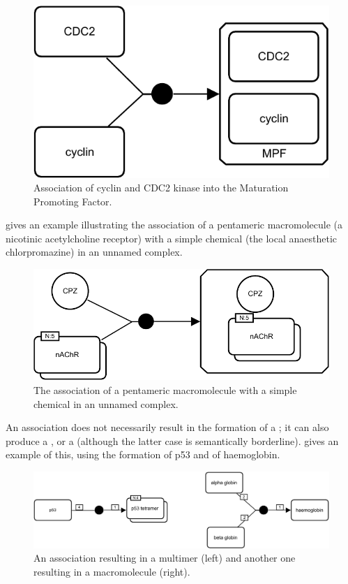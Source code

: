 \begin{figure}[H]
  \centering
  \includegraphics[scale = 0.8]{images/build/association_mpf_example.pdf}
  \caption{Association of cyclin and CDC2 kinase into the Maturation Promoting Factor.}
  \label{fig:assoc-cyclin}
\end{figure}

 gives an example illustrating the association of a pentameric macromolecule (a nicotinic acetylcholine receptor) with a simple chemical (the local anaesthetic chlorpromazine) in an unnamed complex.

\begin{figure}[H]
  \centering
  \includegraphics[scale = 0.8]{images/build/association_unamed_example.pdf}
  \caption{The association of a pentameric macromolecule with a simple chemical in an unnamed complex.}
  \label{fig:assoc-unamed}
\end{figure}

An association does not necessarily result in the formation of a ; it can also produce a , or a  (although the latter case is semantically borderline).   gives an example of this, using the formation of p53 and of haemoglobin.

\begin{figure}[H]
  \centering
  \includegraphics[scale = 0.68]{images/build/association_multimerisation_example.pdf}
  \caption{An association resulting in a multimer (left) and another one resulting in a macromolecule (right).}
  \label{fig:assoc-multi}
\end{figure}
